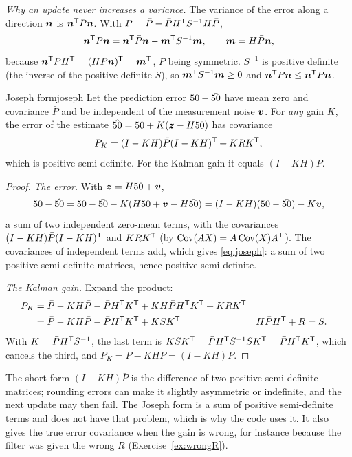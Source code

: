 \emph{Why an update never increases a variance.} The variance of the
error along a direction $\bm{n}$ is $\bm{n}^{\mathsf{T}} P\bm{n}$. With
$P=\bar P-\bar PH^{\mathsf{T}} S^{-1}H\bar P$,
\[
  \bm{n}^{\mathsf{T}} P\bm{n}=\bm{n}^{\mathsf{T}}\bar P\bm{n}-\bm{m}^{\mathsf{T}} S^{-1}\bm{m},
  \qquad\bm{m}=H\bar P\bm{n},
\]
because $\bm{n}^{\mathsf{T}}\bar PH^{\mathsf{T}}=(H\bar P\bm{n})^{\mathsf{T}}=\bm{m}^{\mathsf{T}}$, $\bar P$ being
symmetric. $S^{-1}$ is positive definite (the inverse of the positive
definite $S$), so $\bm{m}^{\mathsf{T}} S^{-1}\bm{m}\ge0$ and
$\bm{n}^{\mathsf{T}} P\bm{n}\le\bm{n}^{\mathsf{T}}\bar P\bm{n}$.

\begin{proposition}{Joseph form}{joseph}
Let the prediction error $50-\bar{50}$ have mean zero and covariance $\bar P$
and be independent of the measurement noise $\bm{v}$. For \emph{any} gain
$K$, the error of the estimate $\hat{50}=\bar{50}+K(\bm{z}-H\bar{50})$ has covariance
\begin{equation}\label{eq:joseph}
  P_K=(I-KH)\bar P(I-KH)^{\mathsf{T}}+KRK^{\mathsf{T}},
\end{equation}
which is positive semi-definite. For the Kalman gain it equals
$(I-KH)\bar P$.
\end{proposition}

\begin{proof}
\emph{The error.} With $\bm{z}=H50+\bm{v}$,
\[
  50-\hat{50}=50-\bar{50}-K(H50+\bm{v}-H\bar{50})=(I-KH)(50-\bar{50})-K\bm{v} ,
\]
a sum of two independent zero-mean terms, with the covariances
$(I-KH)\bar P(I-KH)^{\mathsf{T}}$ and $K RK^{\mathsf{T}}$ (by $\operatorname{Cov}(AX)=A\operatorname{Cov}(X)A^{\mathsf{T}}$). The
covariances of independent terms add, which gives \eqref{eq:joseph}: a
sum of two positive semi-definite matrices, hence positive
semi-definite.

\emph{The Kalman gain.} Expand the product:
\begin{align*}
  P_K&=\bar P-KH\bar P-\bar PH^{\mathsf{T}} K^{\mathsf{T}}+KH\bar PH^{\mathsf{T}} K^{\mathsf{T}}+KRK^{\mathsf{T}}\\
  &=\bar P-KH\bar P-\bar PH^{\mathsf{T}} K^{\mathsf{T}}+KSK^{\mathsf{T}}
  &&H\bar PH^{\mathsf{T}}+R=S .
\end{align*}
With $K=\bar PH^{\mathsf{T}} S^{-1}$, the last term is $KSK^{\mathsf{T}}=\bar PH^{\mathsf{T}} S^{-1}SK^{\mathsf{T}}=
\bar PH^{\mathsf{T}} K^{\mathsf{T}}$, which cancels the third, and $P_K=\bar P-KH\bar P=(I-KH)
\bar P$.
\end{proof}

The short form $(I-KH)\bar P$ is the difference of two positive
semi-definite matrices; rounding errors can make it slightly asymmetric
or indefinite, and the next update may then fail. The Joseph form is a sum
of positive semi-definite terms and does not have that problem, which is
why the code uses it. It also gives the true error covariance when the
gain is wrong, for instance because the filter was given the wrong $R$
(Exercise~\ref{ex:wrongR}).

